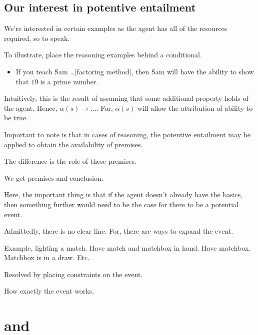 \subsection{Our interest in potentive entailment}
\label{sec:our-inter-potent}

\begin{note}
  We're interested in certain examples as the agent has all of the resources required, so to speak.

  To illustrate, place the reasoning examples behind a conditional.
  \begin{itemize}
  \item If you teach Sam \dots [factoring method], then Sam will have the ability to show that \(19\) is a prime number.
  \end{itemize}
  Intuitively, this is the result of assuming that some additional property holds of the agent.
  Hence, \(\alpha(s) \rightarrow \dots\).
  For, \(\alpha(s)\) will allow the attribution of ability to be true.
\end{note}

\begin{note}
  Important to note is that in cases of reasoning, the potentive entailment may be applied to obtain the availability of premises.

  The difference is the role of these premises.
\end{note}

\begin{note}
  We get premises and conclusion.

  Here, the important thing is that if the agent doesn't already have the basics, then something further would need to be the case for there to be a potential event.

  Admittedly, there is no clear line.
  For, there are ways to expand the event.

  Example, lighting a match.
  Have match and matchbox in hand.
  Have matchbox.
  Matchbox is in a draw.
  Etc.

  Resolved by placing constraints on the event.
\end{note}

\begin{note}
  How exactly the event works.
\end{note}

\section{\AR{} and \WR{}}
\label{sec:ar-wr}

